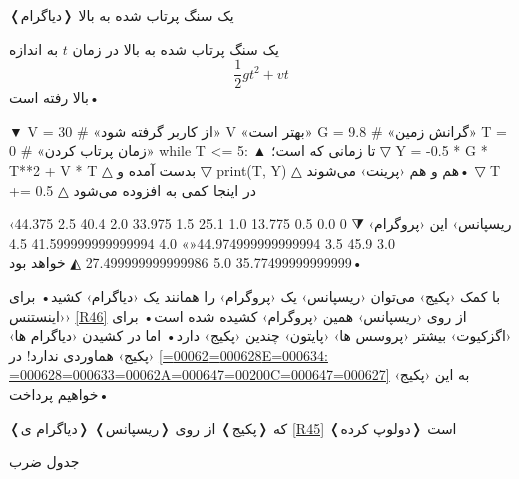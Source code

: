 \documentclass[openany, twocolumn]{book}
\begin{document}
\begin{InlinePrograms}
\begin{Program}
\caption{❬دیاگرام❭ یک سنگ پرتاب شده به بالا\label{R45}}

یک سنگ پرتاب شده به بالا در زمان $t$ به اندازه
\[
\frac{1}{2}gt^{2}+vt
\]
بالا رفته است•

▼
V = 30	# «از کاربر گرفته شود» V «بهتر است»
G = 9.8	# «گرانش زمین»
T = 0	# «زمان پرتاب کردن»
while T <= 5:
▲
 تا زمانی که  است؛ 
▽
	Y = -0.5 * G * T**2 + V * T
△
  بدست آمده و 
▽
	print(T, Y)
△
 هم  و  هم ‹پرینت› می‌شوند• 
▽
	T += 0.5
△
 در اینجا کمی به  افزوده می‌شود

‹ریسپانس› این ‹پروگرام› 
⧨
0 0.0
0.5 13.775
1.0 25.1
1.5 33.975
2.0 40.4
2.5 44.375
3.0 45.9
3.5 44.974999999999994«\NewNoteMark»
4.0 41.599999999999994
4.5 35.77499999999999
5.0 27.499999999999986
◭
 خواهد بود•

با کمک ‹پکیج›  می‌توان ‹ریسپانس› یک ‹پروگرام› را همانند یک ‹دیاگرام› کشید• برای ‹اینستنس› \ref{R46} از روی ‹ریسپانس› همین ‹پروگرام› کشیده شده است• برای ‹اگزکیوت› بیشتر ‹پروسس ها› ‹پایتون› چندین ‹پکیج› دارد• اما در کشیدن ‹دیاگرام ها› ‹پکیج›  هماوردی ندارد! در \ref{=000628=00062E=000634: =000628=000633=00062A=000647=00200C=000647=000627} به این ‹پکیج› خواهیم پرداخت•
\end{Program}

\begin{Figure}

\caption{❬دیاگرام ی❭ که ❬پکیج❭  از روی ❬ریسپانس❭ \ref{R45} ❬دولوپ کرده❭ است\label{R46}}
\end{Figure}

\begin{Program}
\caption{جدول ضرب\label{R47}}


\end{Program}
\end{InlinePrograms}
\end{document}
